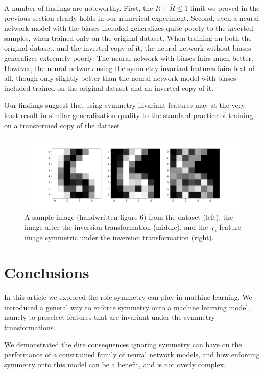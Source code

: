 \documentclass[twocolumn, prl]{revtex4-1}
\begin{document}
A number of findings are noteworthy. First, the $R + \bar{R} \leq 1$ limit we proved in the previous section clearly holds in our numerical experiment. Second, even a neural network model with the biases included generalizes quite poorly to the inverted samples, when trained only on the original dataset. When training on both the original dataset, and the inverted copy of it, the neural network without biases generalizes extremely poorly. The neural network with biases fairs much better. However, the neural network using the symmetry invariant features fairs best of all, though only slightly better than the neural network model with biases included trained on the original dataset and an inverted copy of it.

Our findings suggest that using symmetry invariant features may at the very least result in similar generalization quality to the standard practice of training on a transformed copy of the dataset.

\begin{figure}
\centering
\includegraphics[width=1.0\linewidth]{images/six_cubed}
\caption{A sample image (handwritten figure 6) from the dataset (left), the image after the inversion transformation (middle), and the $\chi_i$ feature image symmetric under the inversion transformation (right).}
\label{fig:six_cubed}
\end{figure}





\section{Conclusions}
\label{Sec:conclusions}

In this article we explored the role symmetry can play in machine learning. We introduced a general way to enforce symmetry onto a machine learning model, namely to preselect features that are invariant under the symmetry transformations.

We demonstrated the dire consequences ignoring symmetry can have on the performance of a constrained family of neural network models, and how enforcing symmetry onto this model can be a benefit, and is not overly complex.
\end{document}
